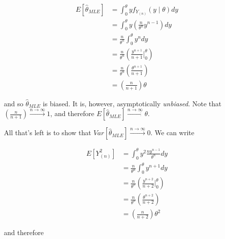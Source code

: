 \documentclass[
  letterpaper,
  DIV=11,
  numbers=noendperiod]{scrreprt}
\begin{document}
\begin{align*}
    E\left[\hat{\theta}_{MLE}\right] & = \int_{0}^\theta y f_{Y_{(n)}} (y \mid \theta) dy \\
    & = \int_{0}^\theta y \left( \frac{n}{\theta^n} y^{n-1} \right) dy \\
    & = \frac{n}{\theta^n} \int_0^\theta y^n dy \\
    & = \frac{n}{\theta^n} \left( \frac{y^{n + 1}}{n + 1} \bigg|_0^\theta \right) \\
    & = \frac{n}{\theta^n} \left( \frac{\theta^{n + 1}}{n + 1} \right) \\
    & = \left( \frac{n}{n + 1} \right) \theta
\end{align*}

and so \(\hat{\theta}_{MLE}\) is biased. It is, however, asymptotically
\emph{unbiased}. Note that
\(\left( \frac{n}{n + 1} \right) \overset{n \to \infty}{\to} 1\), and
therefore
\(E\left[\hat{\theta}_{MLE}\right] \overset{n \to \infty}{\to} \theta\).

All that's left is to show that
\(Var\left[\hat{\theta}_{MLE}\right] \overset{n \to \infty}{\to} 0\). We
can write

\begin{align*}
        E\left[Y_{(n)}^2\right] & = \int_0^\theta y^2 \frac{ny^{n-1}}{\theta^n} dy \\
        & = \frac{n}{\theta^n} \int_0^\theta y^{n + 1} dy \\
        & = \frac{n}{\theta^n} \left( \frac{y^{n + 2}}{n + 2} \bigg|_0^\theta \right) \\
        & = \frac{n}{\theta^n} \left( \frac{\theta^{n + 2}}{n + 2}\right) \\
        & = \left( \frac{n}{n + 2} \right) \theta^2
    \end{align*}

and therefore
\end{document}
